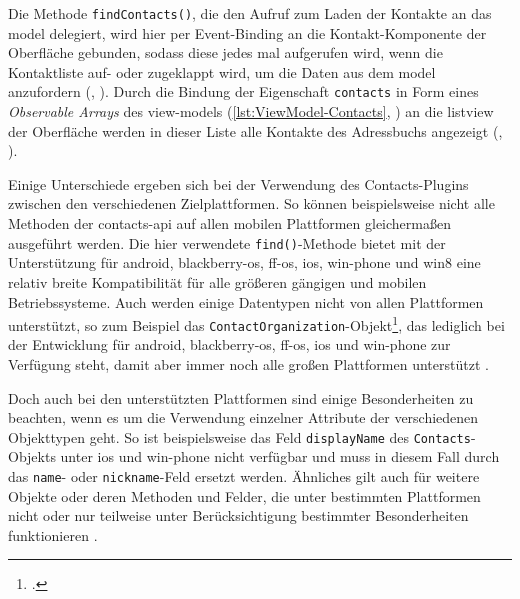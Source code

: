 
Die Methode \lstinline|findContacts()|, die den Aufruf zum Laden der Kontakte an das \gls{model} delegiert, wird hier per Event-Binding an die Kontakt-Komponente der Oberfläche gebunden, sodass diese jedes mal aufgerufen wird, wenn die Kontaktliste auf- oder zugeklappt wird, um die Daten aus dem \gls{model} anzufordern (, ).
Durch die Bindung der Eigenschaft \lstinline|contacts| in Form eines \emph{Observable Arrays} des \glspl{view-model} (\autoref{lst:ViewModel-Contacts}, ) an die \gls{listview} der Oberfläche werden in dieser Liste alle Kontakte des Adressbuchs angezeigt (, ).

	
		
Einige Unterschiede ergeben sich bei der Verwendung des Contacts-Plugins zwischen den verschiedenen Zielplattformen.
So können beispielsweise nicht alle Methoden der contacts-\gls{api} auf allen mobilen Plattformen gleichermaßen ausgeführt werden.
Die hier verwendete \lstinline|find()|-Methode bietet mit der Unterstützung für \gls{android}, \gls{blackberry-os}, \gls{ff-os}, \gls{ios}, \gls{win-phone} und \gls{win8} eine relativ  breite Kompatibilität für alle größeren gängigen und mobilen Betriebssysteme.
Auch werden einige Datentypen nicht von allen Plattformen unterstützt, so zum Beispiel das \lstinline|ContactOrganization|-Objekt\footnote{.}, das lediglich bei der Entwicklung für \gls{android}, \gls{blackberry-os}, \gls{ff-os}, \gls{ios} und \gls{win-phone} zur Verfügung steht, damit aber immer noch alle großen Plattformen unterstützt \cite{Cordova_Plugin_Registry_Contacts}.

Doch auch bei den unterstützten Plattformen sind einige Besonderheiten zu beachten, wenn es um die Verwendung einzelner Attribute der verschiedenen Objekttypen geht.
So ist beispielsweise das Feld \lstinline|displayName| des \lstinline|Contacts|-Objekts unter \gls{ios} und \gls{win-phone} nicht verfügbar und muss in diesem Fall durch das \lstinline|name|- oder \lstinline|nickname|-Feld ersetzt werden. 
Ähnliches gilt auch für weitere Objekte oder deren Methoden und Felder, die unter bestimmten Plattformen nicht oder nur teilweise unter Berücksichtigung bestimmter Besonderheiten funktionieren \cite{Cordova_Plugin_Registry_Contacts}.

